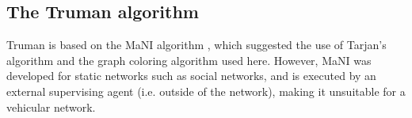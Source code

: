 \documentclass[conference]{IEEEtran}
\begin{document}
%

%
%
%
%

\subsection{The Truman algorithm}
\label{section:trustmanagement}





Truman is based on the MaNI algorithm \cite{vernize2015malicious}, which suggested the use of Tarjan's algorithm and the graph coloring algorithm used here.
However, MaNI was developed for static networks such as social networks, and is executed by an external supervising agent (i.e. outside of the network), making it unsuitable for a vehicular network.
\end{document}
